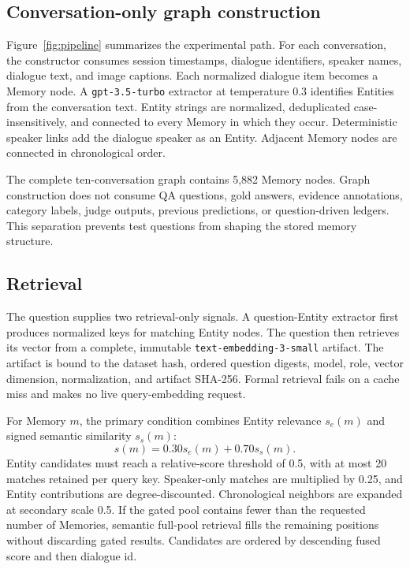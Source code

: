 \documentclass[10pt,twocolumn]{article}
\begin{document}
\subsection{Conversation-only graph construction}

Figure~\ref{fig:pipeline} summarizes the experimental path. For each
conversation, the constructor consumes session timestamps, dialogue
identifiers, speaker names, dialogue text, and image captions. Each normalized
dialogue item becomes a Memory node. A \texttt{gpt-3.5-turbo} extractor at
temperature 0.3 identifies Entities from the conversation text. Entity strings
are normalized, deduplicated case-insensitively, and connected to every Memory
in which they occur. Deterministic speaker links add the dialogue speaker as an
Entity. Adjacent Memory nodes are connected in chronological order.

The complete ten-conversation graph contains 5,882 Memory nodes. Graph
construction does not consume QA questions, gold answers, evidence
annotations, category labels, judge outputs, previous predictions, or
question-driven ledgers. This separation prevents test questions from shaping
the stored memory structure.

\subsection{Retrieval}

The question supplies two retrieval-only signals. A question-Entity extractor
first produces normalized keys for matching Entity nodes. The question then
retrieves its vector from a complete, immutable
\texttt{text-embedding-3-small} artifact. The artifact is bound to the dataset
hash, ordered question digests, model, role, vector dimension, normalization,
and artifact SHA-256. Formal retrieval fails on a cache miss and makes no live
query-embedding request.

For Memory \(m\), the primary condition combines Entity relevance \(s_e(m)\)
and signed semantic similarity \(s_s(m)\):
\begin{equation}
s(m)=0.30s_e(m)+0.70s_s(m).
\label{eq:fusion}
\end{equation}
Entity candidates must reach a relative-score threshold of 0.5, with at most
20 matches retained per query key. Speaker-only matches are multiplied by
0.25, and Entity contributions are degree-discounted. Chronological neighbors
are expanded at secondary scale 0.5. If the gated pool contains fewer than the
requested number of Memories, semantic full-pool retrieval fills the remaining
positions without discarding gated results. Candidates are ordered by
descending fused score and then dialogue id.
\end{document}
